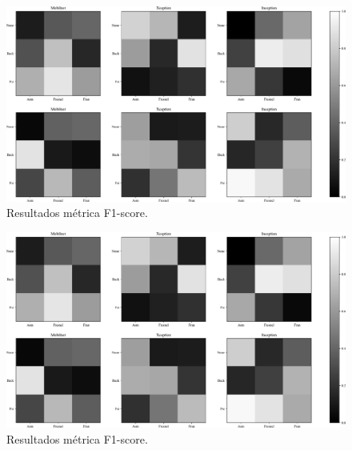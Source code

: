 \begin{figure}[!h]
    \centering
    \includegraphics[width=\linewidth]{images/test_result_f1_score.pdf}
    \caption{Resultados métrica F1-score.}
    \label{fig:results1}
\end{figure}

\begin{figure}[!h]
    \centering
    \includegraphics[width=\linewidth]{images/test_result_f1_score.pdf}
    \caption{Resultados métrica F1-score.}
    \label{fig:results2}
\end{figure}

